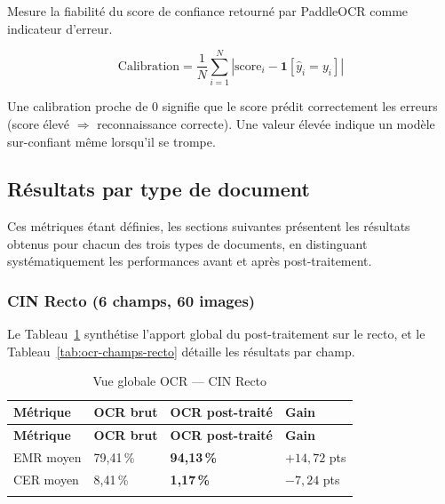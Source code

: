 \begin{tcolorbox}
\noindent Mesure la fiabilité du score de confiance retourné par PaddleOCR comme indicateur d'erreur.

\begin{equation*}
  \text{Calibration} = \frac{1}{N} \sum_{i=1}^{N} \left| \text{score}_i - \mathbf{1}[\hat{y}_i = y_i] \right|
\end{equation*}

\noindent Une calibration proche de 0 signifie que le score prédit correctement les erreurs (score élevé $\Rightarrow$ reconnaissance correcte). Une valeur élevée indique un modèle sur-confiant même lorsqu'il se trompe.

\end{tcolorbox}

\medskip

\subsection{Résultats par type de document}
\label{subsec:resultats-ocr}

Ces métriques étant définies, les sections suivantes présentent les résultats obtenus pour chacun des trois types de documents, en distinguant systématiquement les performances avant et après post-traitement.

\subsubsection{CIN Recto (6 champs, 60 images)}

\noindent Le Tableau~\ref{tab:ocr-global-recto} synthétise l'apport global du post-traitement sur le recto, et le Tableau~\ref{tab:ocr-champs-recto} détaille les résultats par champ.

\renewcommand{\arraystretch}{1.35}
\setlength{\LTleft}{0pt plus 1fill}
\setlength{\LTright}{0pt plus 1fill}
\begin{longtable}{|p{3cm}|p{3.5cm}|p{4cm}|p{3.5cm}|}
  \hline
  \rowcolor{bleu_principal!15}
  \textbf{Métrique} & \textbf{OCR brut} & \textbf{OCR post-traité} & \textbf{Gain} \\
  \hline
  \endfirsthead
  \hline
  \rowcolor{bleu_principal!15}
  \textbf{Métrique} & \textbf{OCR brut} & \textbf{OCR post-traité} & \textbf{Gain} \\
  \hline
  \endhead
  EMR moyen & 79,41\,\% & \textbf{94,13\,\%} & $+14{,}72$ pts \\
  \hline
  CER moyen & 8,41\,\% & \textbf{1,17\,\%} & $-7{,}24$ pts \\
  \hline
  \caption{Vue globale OCR --- CIN Recto}
  \label{tab:ocr-global-recto}
\end{longtable}


